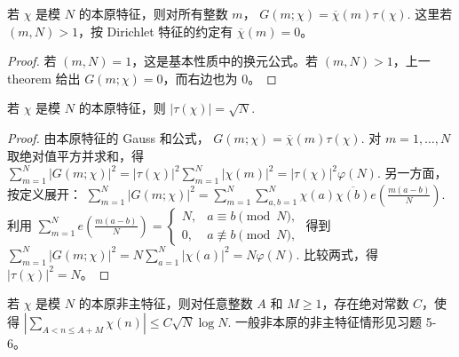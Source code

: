 \begin{theorem}
若 $\chi$ 是模 $N$ 的本原特征，则对所有整数 $m$，
\(
  G(m;\chi)=\overline{\chi}(m)\tau(\chi).
\)
这里若 $(m,N)>1$，按 Dirichlet 特征的约定有 $\overline{\chi}(m)=0$。
\end{theorem}

\begin{proof}
若 $(m,N)=1$，这是基本性质中的换元公式。若 $(m,N)>1$，上一 theorem 给出
$G(m;\chi)=0$，而右边也为 $0$。
\end{proof}

\begin{theorem}
若 $\chi$ 是模 $N$ 的本原特征，则
\(
  |\tau(\chi)|=\sqrt N.
\)
\end{theorem}

\begin{proof}
由本原特征的 Gauss 和公式，
\(
  G(m;\chi)=\overline{\chi}(m)\tau(\chi).
\)
对 $m=1,\ldots,N$ 取绝对值平方并求和，得
\(
  \sum_{m=1}^{N}|G(m;\chi)|^2
  =
  |\tau(\chi)|^2
  \sum_{m=1}^{N}|\chi(m)|^2
  =
  |\tau(\chi)|^2\varphi(N).
\)
另一方面，按定义展开：
\(
  \sum_{m=1}^{N}|G(m;\chi)|^2
  =
  \sum_{m=1}^{N}
  \sum_{a,b=1}^{N}
  \chi(a)\overline{\chi(b)}
  e\!\left(\frac{m(a-b)}{N}\right).
\)
利用
\(
  \sum_{m=1}^{N}e\!\left(\frac{m(a-b)}{N}\right)
  =
  \begin{cases}
    N,& a\equiv b\pmod N,\\
    0,& a\not\equiv b\pmod N,
  \end{cases}
\)
得到
\(
  \sum_{m=1}^{N}|G(m;\chi)|^2
  =
  N\sum_{a=1}^{N}|\chi(a)|^2
  =
  N\varphi(N).
\)
比较两式，得 $|\tau(\chi)|^2=N$。
\end{proof}

\begin{theorem}
若 $\chi$ 是模 $N$ 的本原非主特征，则对任意整数 $A$ 和 $M\ge1$，存在绝对常数 $C$，使得
\(
  \left|\sum_{A<n\le A+M}\chi(n)\right|
  \le C\sqrt N\log N.
\)
一般非本原的非主特征情形见习题 5-6。
\end{theorem}

